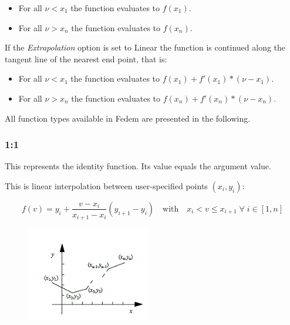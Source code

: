 \begin{itemize}
\item
  For all $\nu < x_1$ the function evaluates to $f(x_1)$.
\item
  For all $\nu > x_n$ the function evaluates to $f(x_n)$.
\end{itemize}

If the {\sl Extrapolation} option is set to Linear the function is
continued along the tangent line of the nearest end point, that is:

\begin{itemize}
\item
  For all $\nu < x_1$ the function evaluates to $f(x_1) + f'(x_1)*(\nu-x_1)$.
\item
  For all $\nu > x_n$ the function evaluates to $f(x_n) + f'(x_n)*(\nu-x_n)$.
\end{itemize}



All function types available in Fedem are presented in the following.

\subsubsection{1:1}

This represents the identity function. Its value equals the argument value.


This is linear interpolation between user-specified points $(x_i, y_i)$:

$$
  f(v) = y_i + \frac{v-x_i}{x_{i+1} - x_i}(y_{i+1}-y_i)
  \quad\mbox{with}\quad
  x_i < v \leq x_{i+1} \;\forall\; i\in[1,n]
$$

\begin{figure}
  \vspace{-12mm}
  \includegraphics[width=0.48\textwidth]{Figures/4-Polyline_numbers}
\end{figure}

